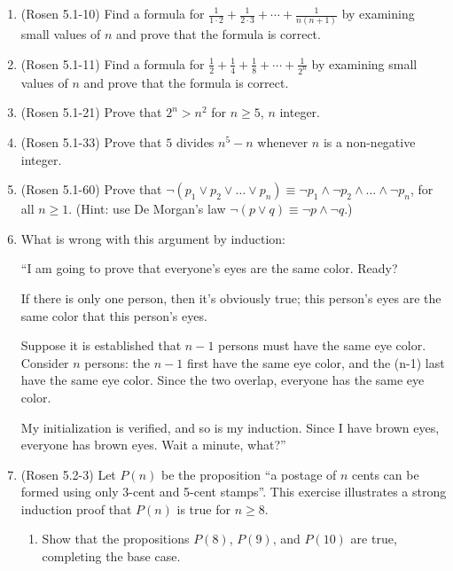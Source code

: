 \begin{enumerate}
\item \strmedium (Rosen 5.1-10) Find a formula for 
$\frac{1}{1 \cdot 2} + \frac{1}{2 \cdot 3} + \cdots + \frac{1}{n (n+1)}$ 
by examining small values of $n$ and prove that the formula is correct.

\item \strmedium (Rosen 5.1-11) Find a formula for 
$\frac{1}{2} + \frac{1}{4} + \frac{1}{8} + \cdots + \frac{1}{2^{n}}$ 
by examining small values of $n$ and prove that the formula is correct.

\item \strmedium (Rosen 5.1-21) Prove that $2^n > n^2$ for $n \geq 5$, $n$ integer.

\item \strmedium (Rosen 5.1-33) Prove that $5$ divides
$n^{5}-n$ whenever $n$ is a non-negative integer.

\item \strmedium (Rosen 5.1-60) Prove that 
$\neg{(p_{1} \vee p_{2} \vee \ldots \vee p_{n})}
\equiv 
\neg{p_{1}} \wedge \neg{p_{2}} \wedge \ldots \wedge \neg{p_{n}}$,
for all $n \geq 1$.
(Hint: use De Morgan's law $\neg{(p \vee q)} \equiv \neg{p} \wedge \neg{q}$.)

\item \strmedium What is wrong with this argument by induction: 

``I am going to prove that everyone's eyes are the same color. Ready?

If there is only one person, then it's obviously true; this person's eyes are the same color that this person's eyes.

Suppose it is established that $n-1$ persons must have the same eye color. Consider $n$ persons: the $n-1$ first have the same eye color, and the (n-1) last have the same eye color. Since the two overlap, everyone has the same eye color.

My initialization is verified, and so is my induction. Since I have brown eyes, everyone has brown eyes. Wait a minute, what?''

\item (Rosen 5.2-3) Let $P(n)$ be the proposition ``a postage of $n$ cents can be formed using only 3-cent and 5-cent stamps''. This exercise illustrates a strong induction proof that $P(n)$ is true for $n \geq 8$.

\begin{enumerate}
\item \streasy Show that the propositions $P(8)$, $P(9)$, and $P(10)$ are true, completing the base case.


\end{enumerate}
\end{enumerate}
